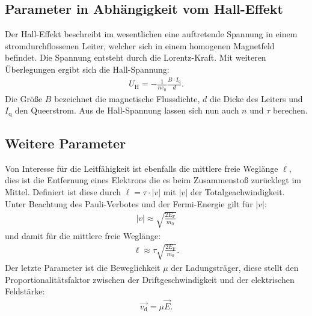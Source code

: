\subsection{Parameter in Abhängigkeit vom Hall-Effekt}
Der Hall-Effekt beschreibt im wesentlichen eine auftretende Spannung in einem stromdurchflossenen Leiter, welcher sich in
einem homogenen Magnetfeld befindet. Die Spannung entsteht durch die Lorentz-Kraft.
Mit weiteren Überlegungen ergibt sich die Hall-Spannung:
\begin{align}
 U_\mathrm{H}=-\frac{1}{ne_0}\frac{B\cdot I_\mathrm{q}}{d}.
\end{align}
Die Größe $B$ bezeichnet die magnetische Flussdichte, $d$ die Dicke des Leiters und $I_\mathrm{q}$ den Queerstrom.
Aus de Hall-Spannung lassen sich nun auch $n$ und $\tau$ berechen.

\subsection{Weitere Parameter}
Von Interesse für die Leitfähigkeit ist ebenfalls die mittlere freie Weglänge $\ell$, dies ist die Entfernung eines Elektrons die
es beim Zusammenstoß zurücklegt im Mittel. Definiert ist diese durch $\ell=\tau\cdot|v|$ mit $|v|$ der Totalgeachwindigkeit.
Unter Beachtung des Pauli-Verbotes und der Fermi-Energie gilt für $|v|$:
\begin{align}
 |v|\approx \sqrt{\frac{2E_\mathrm{F}}{m_0}}
\end{align}
und damit für die mittlere freie Weglänge:
\begin{align}
\ell \approx \tau\sqrt{\frac{2 E_\mathrm{F}}{m_0}}.
\end{align}
Der letzte Parameter ist die Beweglichkeit $\mu$ der Ladungsträger, diese stellt den Proportionalitätsfaktor
zwischen der Driftgeschwindigkeit und der elektrischen Feldstärke:
\begin{align}
\vec{v_\mathrm{d}}=\mu \vec{E}.
\end{align}

